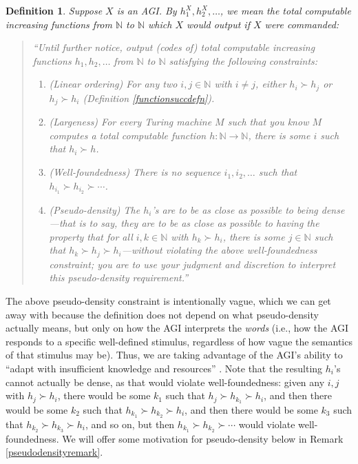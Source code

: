\documentclass{article}
\newtheorem{definition}[theorem]{Definition}
\begin{document}
\begin{definition}
\label{fairsequencedefn}
    Suppose $X$ is an AGI. By $h^X_1,h^X_2,\ldots$, we mean the total computable
    increasing functions
    from $\mathbb N$ to $\mathbb N$ which $X$ would output if $X$ were commanded:
    \begin{quote}
        ``Until further notice, output (codes of) total computable increasing
        functions $h_1,h_2,\ldots$ from $\mathbb N$ to $\mathbb N$ satisfying the
        following constraints:
        \begin{enumerate}
            \item (Linear ordering) For any two $i,j\in\mathbb N$ with $i\neq j$, either
            $h_i\succ h_j$ or $h_j\succ h_i$ (Definition \ref{functionsuccdefn}).
            \item (Largeness) For every Turing machine $M$ such that you know
            $M$ computes a total computable function $h:\mathbb N\to\mathbb N$,
            there is some $i$ such that $h_i\succ h$.
            \item (Well-foundedness) There is no sequence $i_1,i_2,\ldots$ such that
            $h_{i_1}\succ h_{i_2}\succ\cdots$.
            \item (Pseudo-density)
            The $h_i$'s are to be as close as possible to being \emph{dense}---that is
            to say, they are to be as close as possible to having the property that
            for all $i,k\in\mathbb N$ with $h_k\succ h_i$, there is some $j\in\mathbb N$
            such that $h_k\succ h_j\succ h_i$---without violating the above
            well-foundedness constraint; you are to use your judgment and discretion
            to interpret this pseudo-density requirement.''
        \end{enumerate}
    \end{quote}
\end{definition}

The above pseudo-density constraint is intentionally vague, which we can get away
with because the definition does not depend on what pseudo-density actually means,
but only on how the AGI interprets the \emph{words} (i.e., how the AGI responds to a
specific well-defined stimulus, regardless of how vague the semantics of that stimulus
may be).
Thus, we are taking advantage of the AGI's ability to ``adapt with insufficient
knowledge and resources'' \cite{wang2019defining}. Note that the resulting $h_i$'s
cannot actually be dense, as that would violate well-foundedness: given any $i,j$
with $h_j\succ h_i$, there would be some $k_1$ such that $h_j\succ h_{k_1}\succ h_i$,
and then there would be some $k_2$ such that $h_{k_1}\succ h_{k_2}\succ h_i$,
and then there would be some $k_3$ such that $h_{k_2}\succ h_{k_3}\succ h_i$, and so
on, but then $h_{k_1}\succ h_{k_2}\succ \cdots$ would violate well-foundedness.
We will offer some motivation for pseudo-density below in
Remark \ref{pseudodensityremark}.
\end{document}

